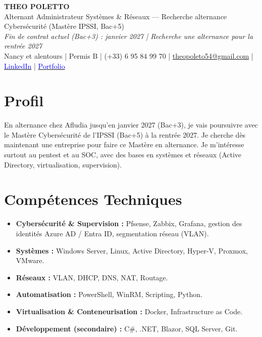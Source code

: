 \documentclass[10pt,a4paper]{article}
\begin{document}
\small

\begin{center}
    {\fontsize{28}{34}\bfseries THEO POLETTO} \\ \vspace{0.05cm}
    {\fontsize{16}{20}\selectfont Alternant Administrateur Systèmes \& Réseaux --- Recherche alternance Cybersécurité (Mastère IPSSI, Bac+5)} \\ \vspace{0.05cm}
    {\fontsize{11}{14}\itshape Fin de contrat actuel (Bac+3) : janvier 2027 | Recherche une alternance pour la rentrée 2027} \\ \vspace{0.05cm}
    {\normalsize Nancy et alentours | Permis B | (+33) 6 95 84 99 70 | \href{mailto:theopoleto54@gmail.com}{theopoleto54@gmail.com} | \href{https://www.linkedin.com/in/theo-poletto/}{\textcolor{blue}{LinkedIn}} | \href{https://poletto-theo.vercel.app/}{\textcolor{blue}{Portfolio}}}
\end{center}

\vspace{0.1cm}

\section*{Profil}
\noindent En alternance chez Afludia jusqu'en janvier 2027 (Bac+3), je vais poursuivre avec le Mastère Cybersécurité de l'IPSSI (Bac+5) à la rentrée 2027. Je cherche dès maintenant une entreprise pour faire ce Mastère en alternance. Je m'intéresse surtout au pentest et au SOC, avec des bases en systèmes et réseaux (Active Directory, virtualisation, supervision).

\section*{Compétences Techniques}
\begin{itemize}[leftmargin=0.5cm, noitemsep, topsep=0pt, partopsep=0pt]
    \item \textbf{Cybersécurité \& Supervision :} Pfsense, Zabbix, Grafana, gestion des identités Azure AD / Entra ID, segmentation réseau (VLAN).
    \item \textbf{Systèmes :} Windows Server, Linux, Active Directory, Hyper-V, Proxmox, VMware.
    \item \textbf{Réseaux :} VLAN, DHCP, DNS, NAT, Routage.
    \item \textbf{Automatisation :} PowerShell, WinRM, Scripting, Python.
    \item \textbf{Virtualisation \& Conteneurisation :} Docker, Infrastructure as Code.
    \item \textbf{Développement (secondaire) :} C\#, .NET, Blazor, SQL Server, Git.
\end{itemize}
\end{document}
